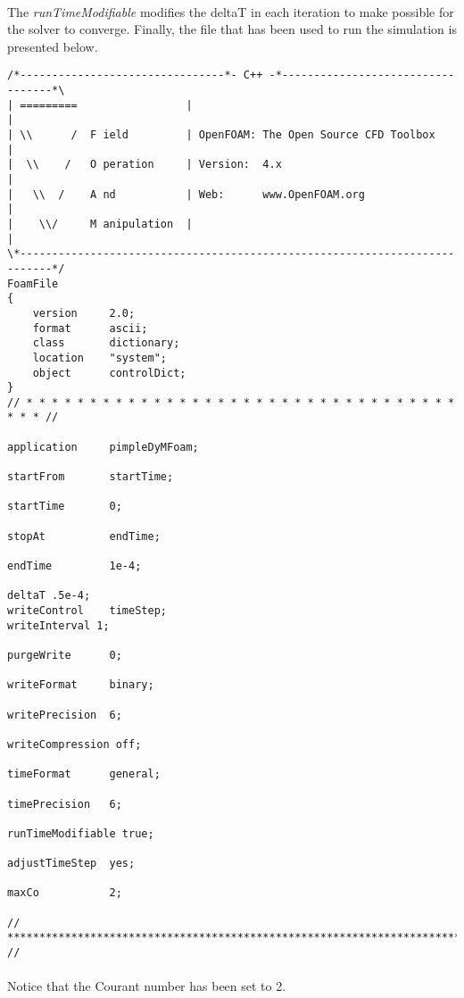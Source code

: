 \paragraph{}The \textit{runTimeModifiable} modifies the deltaT in each iteration to make possible for the solver to converge. Finally, the file that has been used to run the simulation is presented below.

\begin{footnotesize}
\begin{verbatim}
/*--------------------------------*- C++ -*----------------------------------*\
| =========                 |                                                 |
| \\      /  F ield         | OpenFOAM: The Open Source CFD Toolbox           |
|  \\    /   O peration     | Version:  4.x                                   |
|   \\  /    A nd           | Web:      www.OpenFOAM.org                      |
|    \\/     M anipulation  |                                                 |
\*---------------------------------------------------------------------------*/
FoamFile
{
    version     2.0;
    format      ascii;
    class       dictionary;
    location    "system";
    object      controlDict;
}
// * * * * * * * * * * * * * * * * * * * * * * * * * * * * * * * * * * * * * //

application     pimpleDyMFoam;

startFrom       startTime;

startTime       0;

stopAt          endTime;

endTime         1e-4;

deltaT .5e-4;
writeControl    timeStep;
writeInterval 1;

purgeWrite      0;

writeFormat     binary;

writePrecision  6;

writeCompression off;

timeFormat      general;

timePrecision   6;

runTimeModifiable true;

adjustTimeStep  yes;

maxCo           2;

// ************************************************************************* //
\end{verbatim}
\end{footnotesize}

\paragraph{}Notice that the Courant number has been set to 2.